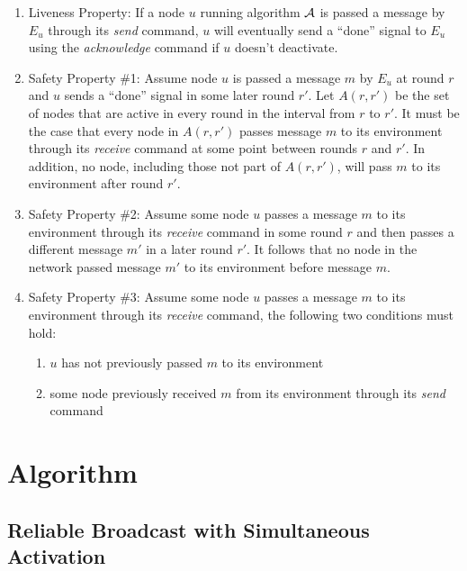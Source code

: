 \documentclass[english]{article}
\begin{document}
\begin {enumerate}
 
  \item Liveness Property: If a node $u$ running algorithm $\cal A$ is passed a message by $E_u$ through its \textit{send} command, $u$ will eventually send  a ``done'' signal to $E_u$ using the \textit{acknowledge} command if $u$ doesn't deactivate.

  \item Safety Property \#1: Assume node $u$ is passed a message $m$ by $E_u$ at round $r$ and $u$ sends  a ``done'' signal in some later round $r'$. Let $A(r,r')$ be the set of nodes that are active in every round in the interval from $r$ to $r'$. It must be the case that every node in $A(r,r')$ passes message $m$ to its environment through its \textit{receive} command at some point between rounds $r$ and $r'$. In addition, no node, including those not part of $A(r,r')$, will pass $m$ to its environment after round $r'$. 

  \item Safety Property \#2: Assume some node $u$ passes a message $m$ to its environment through its \textit{receive} command in some round $r$ and then passes a different message $m'$ in a later round $r'$. It follows that no node in the network passed message $m'$ to its environment before message $m$. 

  \item Safety Property \#3: Assume some node $u$ passes a message $m$ to its environment through its \textit{receive} command, the following two conditions must hold:
  \begin {enumerate}
    \item $u$ has not previously passed $m$ to its environment
    \item some node previously received $m$ from its environment through its \textit{send} command
  \end{enumerate}

\end{enumerate}


\section{Algorithm}

  \subsection {Reliable Broadcast with Simultaneous Activation}
\end{document}
